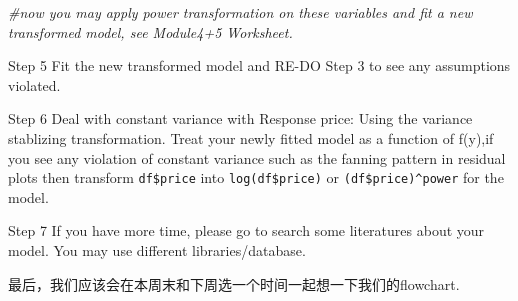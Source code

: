 \documentclass[
]{article}
\newenvironment{Shaded}{\begin{snugshade}}{\end{snugshade}}
\newcommand{\CommentTok}[1]{\textcolor[rgb]{0.56,0.35,0.01}{\textit{#1}}}
\begin{document}
\begin{Shaded}
\begin{Highlighting}[]
\CommentTok{\#now you may apply power transformation on these variables and fit a new transformed model, see Module4+5 Worksheet.}
\end{Highlighting}
\end{Shaded}

Step 5 Fit the new transformed model and RE-DO Step 3 to see any
assumptions violated.

Step 6 Deal with constant variance with Response price: Using the
variance stablizing transformation. Treat your newly fitted model as a
function of f(y),if you see any violation of constant variance such as
the fanning pattern in residual plots then transform \texttt{df\$price}
into \texttt{log(df\$price)} or \texttt{(df\$price)\^{}power} for the
model.

Step 7 If you have more time, please go to search some literatures about
your model. You may use different libraries/database.

最后，我们应该会在本周末和下周选一个时间一起想一下我们的flowchart.
\end{document}
